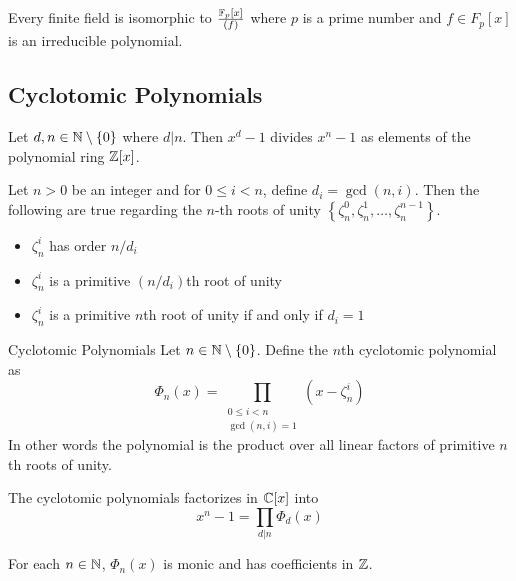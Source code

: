 \documentclass[a4paper]{article}
\begin{document}
\begin{prp}{}{} Every finite field is isomorphic to $\frac{\mathbb{F}_p[x]}{(f)}$ where $p$ is a prime number and $f\in F_p[x]$ is an irreducible polynomial. 
\end{prp}

\subsection{Cyclotomic Polynomials}
\begin{lmm}{}{} Let $d,n\in\mathbb{N}\setminus\{0\}$ where $d|n$. Then $x^d-1$ divides $x^n-1$ as elements of the polynomial ring $\mathbb{Z}[x]$. 
\end{lmm}

\begin{lmm}{}{} Let $n>0$ be an integer and for $0\leq i<n$, define $d_i=\gcd(n,i)$. Then the following are true regarding the $n$-th roots of unity $\left\{\zeta_n^0,\zeta_n^1,\dots,\zeta_n^{n-1}\right\}$. 
\begin{itemize}
\item $\zeta_n^i$ has order $n/d_i$
\item $\zeta_n^i$ is a primitive $(n/d_i)$th root of unity
\item $\zeta_n^i$ is a primitive $n$th root of unity if and only if $d_i=1$
\end{itemize}
\end{lmm}

\begin{defn}{Cyclotomic Polynomials}{} Let $n\in\mathbb{N}\setminus\{0\}$. Define the $n$th cyclotomic polynomial as $$\Phi_n(x)=\prod_{\substack{0\leq i<n\\\gcd(n,i)=1}}\left(x-\zeta_n^i\right)$$
In other words the polynomial is the product over all linear factors of primitive $n$th roots of unity. 
\end{defn}

\begin{prp}{}{} The cyclotomic polynomials factorizes in $\mathbb{C}[x]$ into $$x^n-1=\prod_{d|n}\Phi_d(x)$$
\end{prp}

\begin{prp}{}{} For each $n\in\mathbb{N}$, $\Phi_n(x)$ is monic and has coefficients in $\mathbb{Z}$. 
\end{prp}
\end{document}
